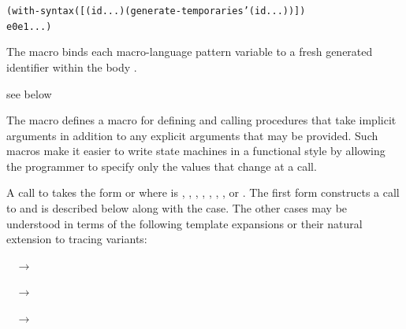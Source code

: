 \begin{syntax}
\end{syntax}
\expandsto{}\begin{alltt}\antipar
(with-syntax ([(id ...) (generate-temporaries '(id ...))])
  e0 e1 ...)\end{alltt}

The  macro binds each macro-language
pattern variable  to a fresh generated identifier
within the body .

\begin{syntax}
\end{syntax}
\expandsto{} see below

The  macro defines a macro  for defining
and calling procedures that take implicit  arguments in addition
to any explicit arguments that may be provided.
Such macros make it easier to write state machines in a functional style
by allowing the programmer to specify only the values that change at a call.

A call to  takes the form
or
where  is
,
,
,
,
,
,
, or
.
The first form constructs a call to  and is described below
along with the  case.
The other cases may be understood in terms of the following template
expansions or their natural extension to tracing variants:

~
$\rightarrow$

~
$\rightarrow$

~
$\rightarrow$

